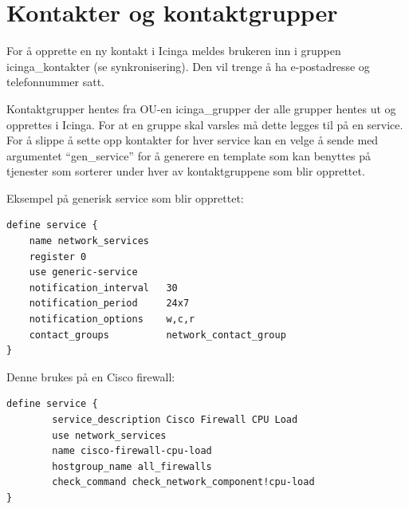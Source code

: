 \section{Kontakter og kontaktgrupper}

For å opprette en ny kontakt i Icinga meldes brukeren inn i gruppen icinga\_kontakter (se synkronisering). Den vil trenge å ha e-postadresse og telefonnummer satt.

Kontaktgrupper hentes fra OU-en icinga\_grupper der alle grupper hentes ut og opprettes i Icinga. For at en gruppe skal varsles må dette legges til på en service. For å slippe å sette opp kontakter for hver service kan en velge å sende med argumentet “gen\_service” for å generere en template som kan benyttes på tjenester som sorterer under hver av kontaktgruppene som blir opprettet.

Eksempel på generisk service som blir opprettet:
\begin{lstlisting}
define service {
    name network_services
    register 0
    use generic-service     
    notification_interval   30
    notification_period     24x7
    notification_options    w,c,r
    contact_groups          network_contact_group
}
\end{lstlisting}

Denne brukes på en Cisco firewall: 
\begin{lstlisting}
define service {
        service_description Cisco Firewall CPU Load
        use network_services
        name cisco-firewall-cpu-load
        hostgroup_name all_firewalls
        check_command check_network_component!cpu-load
}
\end{lstlisting}

